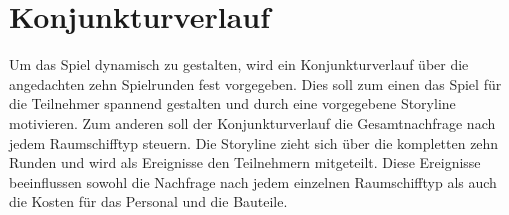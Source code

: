 \section{Konjunkturverlauf}
\label{sec:spielwelt-szenario-konjunkturverlauf}

Um das Spiel dynamisch zu gestalten, wird ein Konjunkturverlauf über die angedachten zehn Spielrunden fest vorgegeben. Dies soll zum einen das Spiel für die Teilnehmer spannend gestalten und durch eine vorgegebene Storyline motivieren. Zum anderen soll der Konjunkturverlauf die Gesamtnachfrage nach jedem Raumschifftyp steuern. Die Storyline zieht sich über die kompletten zehn Runden und wird als Ereignisse den Teilnehmern mitgeteilt. Diese Ereignisse beeinflussen sowohl die Nachfrage nach jedem einzelnen Raumschifftyp als auch die Kosten für das Personal und die Bauteile.